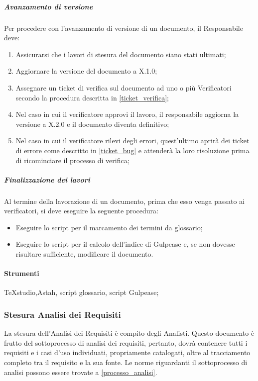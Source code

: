\subparagraph{Avanzamento di versione}
Per procedere con l'avanzamento di versione di un documento, il Responsabile deve:
\begin{enumerate}
\item Assicurarsi che i lavori di stesura del documento siano stati ultimati;
\item Aggiornare la versione del documento a X.1.0;
\item Assegnare un ticket di verifica sul documento ad uno o più Verificatori secondo la procedura descritta in \ref{ticket_verifica};
\item Nel caso in cui il verificatore approvi il lavoro, il responsabile aggiorna la versione a X.2.0 e il documento diventa definitivo;
\item Nel caso in cui il verificatore rilevi degli errori, quest'ultimo aprirà dei ticket di errore come descritto in \ref{ticket_bug} e attenderà la loro risoluzione prima di ricominciare il processo di verifica;
\end{enumerate}

\subparagraph{Finalizzazione dei lavori}
Al termine della lavorazione di un documento, prima che esso venga passato ai verificatori, si deve eseguire la seguente procedura:
\begin{itemize}
\item Eseguire lo script per il marcamento dei termini da glossario;
\item Eseguire lo script per il calcolo dell'indice di Gulpease e, se non dovesse risultare sufficiente, modificare il documento.
\end{itemize}

\paragraph{Strumenti}
TeXstudio,Astah, script glossario, script Gulpease;

\subsubsection{Stesura Analisi dei Requisiti}
La stesura dell'Analisi dei Requisiti è compito degli Analisti.
Questo documento è frutto del sottoprocesso di analisi dei requisiti, pertanto, dovrà contenere tutti i requisiti e i casi d'uso individuati, propriamente catalogati, oltre al tracciamento completo tra il requisito e la sua fonte.
Le norme riguardanti il sottoprocesso di analisi possono essere trovate a \ref{processo_analisi}.


